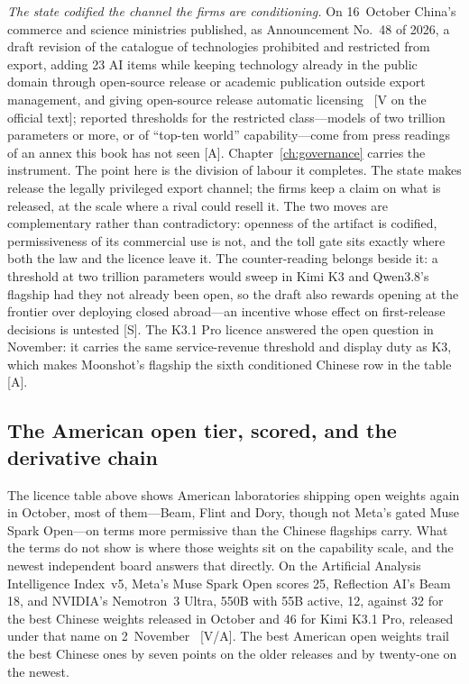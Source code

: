 \emph{The state codified the channel the firms are conditioning.} On 16~October China's commerce and science ministries published, as Announcement No.~48 of 2026, a draft revision of the catalogue of technologies prohibited and restricted from export, adding 23 AI items while keeping technology already in the public domain through open-source release or academic publication outside export management, and giving open-source release automatic licensing~\cite{gov-mofcom-catalogue} [V on the official text]; reported thresholds for the restricted class---models of two trillion parameters or more, or of ``top-ten world'' capability---come from press readings of an annex this book has not seen [A]. Chapter~\ref{ch:governance} carries the instrument. The point here is the division of labour it completes. The state makes release the legally privileged export channel; the firms keep a claim on what is released, at the scale where a rival could resell it. The two moves are complementary rather than contradictory: openness of the artifact is codified, permissiveness of its commercial use is not, and the toll gate sits exactly where both the law and the licence leave it. The counter-reading belongs beside it: a threshold at two trillion parameters would sweep in Kimi K3 and Qwen3.8's flagship had they not already been open, so the draft also rewards opening at the frontier over deploying closed abroad---an incentive whose effect on first-release decisions is untested [S]. The K3.1 Pro licence answered the open question in November: it carries the same service-revenue threshold and display duty as K3, which makes Moonshot's flagship the sixth conditioned Chinese row in the table~\cite{lit-k31-weights} [A].

\subsection{The American open tier, scored, and the derivative chain}
\label{sec:lit-us-open}

The licence table above shows American laboratories shipping open weights again in October, most of them---Beam, Flint and Dory, though not Meta's gated Muse Spark Open---on terms more permissive than the Chinese flagships carry. What the terms do not show is where those weights sit on the capability scale, and the newest independent board answers that directly. On the Artificial Analysis Intelligence Index~v5, Meta's Muse Spark Open scores 25, Reflection AI's Beam 18, and NVIDIA's Nemotron~3 Ultra, 550B with 55B active, 12, against 32 for the best Chinese weights released in October and 46 for Kimi K3.1 Pro, released under that name on 2~November~\cite{lit-beam-aa,lit-k31-weights} [V/A]. The best American open weights trail the best Chinese ones by seven points on the older releases and by twenty-one on the newest.

